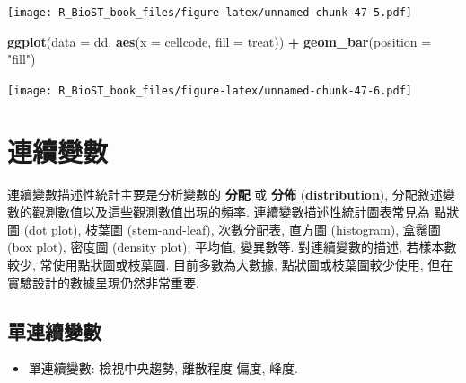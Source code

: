 \documentclass[
]{book}
\newenvironment{Shaded}{\begin{snugshade}}{\end{snugshade}}
\newcommand{\CommentTok}[1]{\textcolor[rgb]{0.56,0.35,0.01}{\textit{#1}}}
\newcommand{\DataTypeTok}[1]{\textcolor[rgb]{0.13,0.29,0.53}{#1}}
\newcommand{\KeywordTok}[1]{\textcolor[rgb]{0.13,0.29,0.53}{\textbf{#1}}}
\newcommand{\NormalTok}[1]{#1}
\newcommand{\OperatorTok}[1]{\textcolor[rgb]{0.81,0.36,0.00}{\textbf{#1}}}
\newcommand{\OtherTok}[1]{\textcolor[rgb]{0.56,0.35,0.01}{#1}}
\newcommand{\StringTok}[1]{\textcolor[rgb]{0.31,0.60,0.02}{#1}}
\providecommand{\tightlist}{%
  \setlength{\itemsep}{0pt}\setlength{\parskip}{0pt}}
\begin{document}
\texttt{[image: R\_BioST\_book\_files/figure-latex/unnamed-chunk-47-5.pdf]}

\begin{Shaded}
\begin{Highlighting}[]
\KeywordTok{ggplot}\NormalTok{(}\DataTypeTok{data =}\NormalTok{ dd, }\KeywordTok{aes}\NormalTok{(}\DataTypeTok{x =}\NormalTok{ cellcode, }\DataTypeTok{fill =}\NormalTok{ treat)) }\OperatorTok{+}\StringTok{ }
\StringTok{  }\KeywordTok{geom\_bar}\NormalTok{(}\DataTypeTok{position =} \StringTok{"fill"}\NormalTok{)}
\end{Highlighting}
\end{Shaded}

\texttt{[image: R\_BioST\_book\_files/figure-latex/unnamed-chunk-47-6.pdf]}

\hypertarget{ux9023ux7e8cux8b8aux6578}{%
\section{連續變數}\label{ux9023ux7e8cux8b8aux6578}}

連續變數描述性統計主要是分析變數的
\textbf{分配}
或
\textbf{分佈}
(\textbf{distribution}),
分配敘述變數的觀測數值以及這些觀測數值出現的頻率.
連續變數描述性統計圖表常見為
點狀圖 (dot plot), 枝葉圖 (stem-and-leaf),
次數分配表, 直方圖 (histogram), 盒鬚圖 (box plot),
密度圖 (density plot), 平均值, 變異數等.
對連續變數的描述, 若樣本數較少,
常使用點狀圖或枝葉圖.
目前多數為大數據, 點狀圖或枝葉圖較少使用,
但在實驗設計的數據呈現仍然非常重要.

\hypertarget{ux55aeux9023ux7e8cux8b8aux6578}{%
\subsection{單連續變數}\label{ux55aeux9023ux7e8cux8b8aux6578}}

\begin{itemize}
\tightlist
\item
  單連續變數: 檢視中央趨勢, 離散程度 偏度, 峰度.
\end{itemize}

\begin{Shaded}
\end{Shaded}
\end{document}
